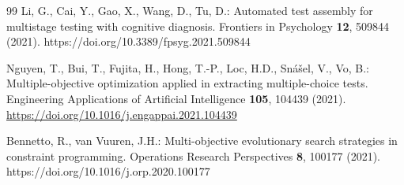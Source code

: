 \documentclass[runningheads]{llncs}
\begin{document}
\begin{thebibliography}{99}
Li, G., Cai, Y., Gao, X., Wang, D., Tu, D.: Automated test assembly for multistage testing with cognitive diagnosis. Frontiers in Psychology \textbf{12}, 509844 (2021). https://doi.org/10.3389/fpsyg.2021.509844

Nguyen, T., Bui, T., Fujita, H., Hong, T.-P., Loc, H.D., Sn\'a\v{s}el, V., Vo, B.: Multiple-objective optimization applied in extracting multiple-choice tests. Engineering Applications of Artificial Intelligence \textbf{105}, 104439 (2021). \url{https://doi.org/10.1016/j.engappai.2021.104439}

Bennetto, R., van Vuuren, J.H.: Multi-objective evolutionary search strategies in constraint programming. Operations Research Perspectives \textbf{8}, 100177 (2021). https://doi.org/10.1016/j.orp.2020.100177
\end{thebibliography}
\end{document}
